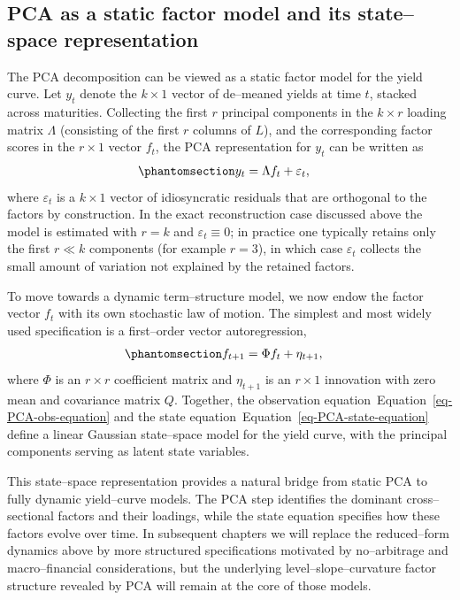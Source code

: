 \documentclass[
  letterpaper,
  DIV=11,
  numbers=noendperiod]{scrreprt}
\begin{document}
\subsection{PCA as a static factor model and its state--space
representation}\label{pca-as-a-static-factor-model-and-its-statespace-representation}

The PCA decomposition can be viewed as a static factor model for the
yield curve. Let \(y_t\) denote the \(k\times 1\) vector of de--meaned
yields at time \(t\), stacked across maturities. Collecting the first
\(r\) principal components in the \(k\times r\) loading matrix
\(\Lambda\) (consisting of the first \(r\) columns of \(L\)), and the
corresponding factor scores in the \(r\times 1\) vector \(f_t\), the PCA
representation for \(y_t\) can be written as
\begin{equation}\protect\phantomsection\label{eq-PCA-obs-equation}{
\begin{align}
    y_t &= \Lambda f_t + \varepsilon_t,
\end{align}
}\end{equation} where \(\varepsilon_t\) is a \(k\times 1\) vector of
idiosyncratic residuals that are orthogonal to the factors by
construction. In the exact reconstruction case discussed above the model
is estimated with \(r=k\) and \(\varepsilon_t\equiv 0\); in practice one
typically retains only the first \(r\ll k\) components (for example
\(r=3\)), in which case \(\varepsilon_t\) collects the small amount of
variation not explained by the retained factors.

To move towards a dynamic term--structure model, we now endow the factor
vector \(f_t\) with its own stochastic law of motion. The simplest and
most widely used specification is a first--order vector autoregression,
\begin{equation}\protect\phantomsection\label{eq-PCA-state-equation}{
\begin{align}
    f_{t+1} &= \Phi f_t + \eta_{t+1},
\end{align}
}\end{equation} where \(\Phi\) is an \(r\times r\) coefficient matrix
and \(\eta_{t+1}\) is an \(r\times 1\) innovation with zero mean and
covariance matrix \(Q\). Together, the observation
equation~Equation~\ref{eq-PCA-obs-equation} and the state
equation~Equation~\ref{eq-PCA-state-equation} define a linear Gaussian
state--space model for the yield curve, with the principal components
serving as latent state variables.

This state--space representation provides a natural bridge from static
PCA to fully dynamic yield--curve models. The PCA step identifies the
dominant cross--sectional factors and their loadings, while the state
equation specifies how these factors evolve over time. In subsequent
chapters we will replace the reduced--form dynamics above by more
structured specifications motivated by no--arbitrage and
macro--financial considerations, but the underlying
level--slope--curvature factor structure revealed by PCA will remain at
the core of those models.
\end{document}
